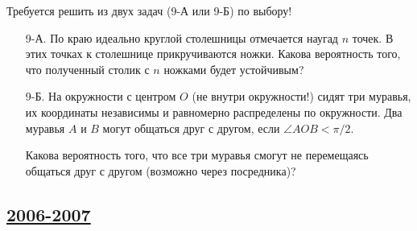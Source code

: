 Требуется решить \textbf{} из двух задач (9-А или 9-Б) по
выбору!

\begin{enumerate}
\item[9-А.] По краю идеально круглой столешницы отмечается наугад $n$ точек.
В этих точках к столешнице прикручиваются ножки. Какова вероятность того, что
полученный столик с $n$ ножками будет устойчивым?

\item[9-Б.] На окружности  с центром $O$ (не внутри окружности!) сидят три муравья, их
координаты независимы и равномерно распределены по окружности. Два
муравья $A$ и $B$ могут общаться друг с другом, если $\angle AOB<\pi/2$.

Какова вероятность того, что все три муравья смогут не перемещаясь
общаться друг с другом (возможно через посредника)?
\end{enumerate}


\newpage
\subsection[2006-2007]{\hyperref[sec:sol_kr_01_2006_2007]{2006-2007}}
\label{sec:kr_01_2006_2007}


